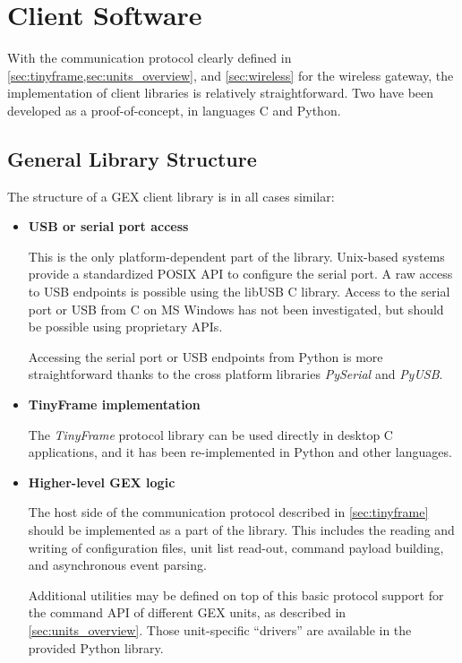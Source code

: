 \chapter{Client Software} \label{sec:clientsw}

With the communication protocol clearly defined in \cref{sec:tinyframe,sec:units_overview}, and \cref{sec:wireless} for the wireless gateway, the implementation of client libraries is relatively straightforward. Two have been developed as a proof-of-concept, in languages C and Python.

\section{General Library Structure}

The structure of a GEX client library is in all cases similar:

\begin{itemize}
    \item \textbf{USB or serial port access}

        This is the only platform-dependent part of the library. Unix-based systems provide a standardized POSIX API to configure the serial port. A raw access to \gls{USB} endpoints is possible using the libUSB C library. Access to the serial port or \gls{USB} from C on MS Windows has not been investigated, but should be possible using proprietary APIs.

        Accessing the serial port or \gls{USB} endpoints from Python is more straightforward thanks to the cross platform libraries \textit{PySerial} and \textit{PyUSB}.

    \item \textbf{TinyFrame implementation}

        The \textit{TinyFrame} protocol library can be used directly in desktop C applications, and it has been re-implemented in Python and other languages.

    \item \textbf{Higher-level GEX logic}

        The host side of the communication protocol described in \cref{sec:tinyframe} should be implemented as a part of the library. This includes the reading and writing of configuration files, unit list read-out, command payload building, and asynchronous event parsing.

        Additional utilities may be defined on top of this basic protocol support for the command API of different GEX units, as described in \cref{sec:units_overview}. Those unit-specific ``drivers'' are available in the provided Python library.
\end{itemize}


